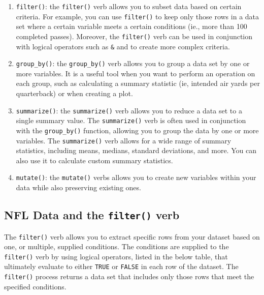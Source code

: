\documentclass[
  letterpaper,
]{krantz}
\providecommand{\tightlist}{%
  \setlength{\itemsep}{0pt}\setlength{\parskip}{0pt}}\usepackage{longtable,booktabs,array}
\begin{document}
\begin{enumerate}
\def\labelenumi{\arabic{enumi}.}
\tightlist
\item
  \texttt{filter()}: the \texttt{filter()} verb allows you to subset
  data based on certain criteria. For example, you can use
  \texttt{filter()} to keep only those rows in a data set where a
  certain variable meets a certain conditions (ie., more than 100
  completed passes). Moreover, the \texttt{filter()} verb can be used in
  conjunction with logical operators such as \texttt{\&} and
  \texttt{\textbar{}} to create more complex criteria.
\item
  \texttt{group\_by()}: the \texttt{group\_by()} verb allows you to
  group a data set by one or more variables. It is a useful tool when
  you want to perform an operation on each group, such as calculating a
  summary statistic (ie, intended air yards per quarterback) or when
  creating a plot.
\item
  \texttt{summarize()}: the \texttt{summarize()} verb allows you to
  reduce a data set to a single summary value. The \texttt{summarize()}
  verb is often used in conjunction with the \texttt{group\_by()}
  function, allowing you to group the data by one or more variables. The
  \texttt{summarize()} verb allows for a wide range of summary
  statistics, including means, medians, standard deviations, and more.
  You can also use it to calculate custom summary statistics.
\item
  \texttt{mutate()}: the \texttt{mutate()} verbs allows you to create
  new variables within your data while also preserving existing ones.
\end{enumerate}

\hypertarget{nfl-data-and-the-filter-verb}{%
\subsection{\texorpdfstring{NFL Data and the \texttt{filter()}
verb}{NFL Data and the filter() verb}}\label{nfl-data-and-the-filter-verb}}

The \texttt{filter()} verb allows you to extract specific rows from your
dataset based on one, or multiple, supplied conditions. The conditions
are supplied to the \texttt{filter()} verb by using logical operators,
listed in the below table, that ultimately evaluate to either
\texttt{TRUE} or \texttt{FALSE} in each row of the dataset. The
\texttt{filter()} process returns a data set that includes only those
rows that meet the specified conditions.
\end{document}
